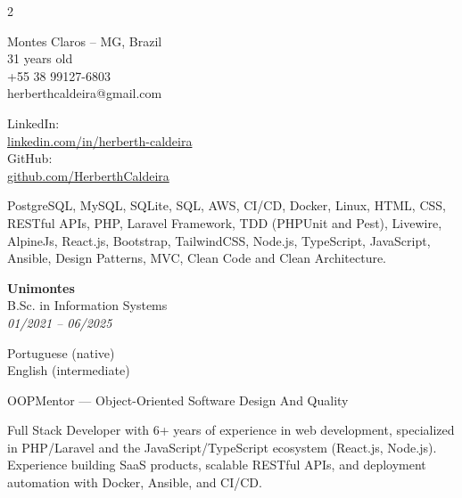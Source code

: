 \documentclass[10pt]{article}
\begin{document}
\begin{paracol}{2}

\small
{}

Montes Claros -- MG, Brazil\\
31 years old\\
+55 38 99127-6803\\
herberthcaldeira@gmail.com

LinkedIn:\\
\href{https://www.linkedin.com/in/herberth-caldeira-1a82791ba}{linkedin.com/in/herberth-caldeira}\\[4pt]
GitHub:\\
\href{https://github.com/HerberthCaldeira}{github.com/HerberthCaldeira}

PostgreSQL, MySQL, SQLite, SQL, AWS, CI/CD, Docker, Linux, HTML, CSS, RESTful APIs, PHP, Laravel Framework, TDD (PHPUnit and Pest), Livewire, AlpineJs, React.js, Bootstrap, TailwindCSS, Node.js, TypeScript, JavaScript, Ansible, Design Patterns, MVC, Clean Code and Clean Architecture.

\textbf{Unimontes}\\
B.Sc. in Information Systems\\
\textit{01/2021 -- 06/2025}

Portuguese (native)\\
English (intermediate)

OOPMentor --- Object-Oriented Software Design And Quality

\switchcolumn

\small
{}
Full Stack Developer with 6+ years of experience in web development, specialized in PHP/Laravel and the JavaScript/TypeScript ecosystem (React.js, Node.js). Experience building SaaS products, scalable RESTful APIs, and deployment automation with Docker, Ansible, and CI/CD.



\end{paracol}
\end{document}
